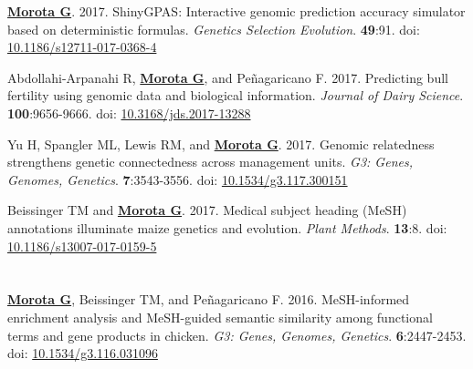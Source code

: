 \documentclass[margin,line,10pt]{res}
\newenvironment{list1}{
  \begin{list}{\ding{113}}{%
      \setlength{\itemsep}{0in}
      \setlength{\parsep}{0in} \setlength{\parskip}{0in}
      \setlength{\topsep}{0in} \setlength{\partopsep}{0in} 
      \setlength{\leftmargin}{0.17in}}}{\end{list}}
\begin{document}
\begin{resume}
\begin{list1}
\item  [{\bf 18}.] \textbf{\underline{Morota G}}. 2017. ShinyGPAS: Interactive genomic prediction accuracy simulator based on deterministic formulas. \emph{Genetics Selection Evolution}. \textbf{49}:91. doi: \textcolor{blue}{\href{https://dx.doi.org/10.1186/s12711-017-0368-4}{10.1186/s12711-017-0368-4}}

  \vspace{0.5cm}
    
\item  [{\bf 17}.] Abdollahi-Arpanahi R, \textbf{\underline{Morota G}}, and  Pe\~{n}agaricano F. 2017. Predicting bull fertility using genomic data and biological information. \emph{Journal of Dairy Science}. \textbf{100}:9656-9666. doi: \textcolor{blue}{\href{https://doi.org/10.3168/jds.2017-13288}{10.3168/jds.2017-13288}}

    \vspace{0.5cm}
    
  \item  [{\bf 16}.]  Yu H, Spangler ML, Lewis RM, and \textbf{\underline{Morota G}}. 2017. Genomic relatedness strengthens genetic connectedness across management units. \emph{G3: Genes, Genomes, Genetics}. \textbf{7}:3543-3556. doi: \textcolor{blue}{\href{https://doi.org/10.1534/g3.117.300151}{10.1534/g3.117.300151}}

    \vspace{0.5cm}
    
\item [{\bf 15}.] Beissinger TM and \textbf{\underline{Morota G}}. 2017. Medical subject heading (MeSH) annotations illuminate maize genetics and evolution. \emph{Plant Methods}. \textbf{13}:8. doi: \textcolor{blue}{\href{http://dx.doi.org/10.1186/s13007-017-0159-5}{10.1186/s13007-017-0159-5}}

\end{list1}



\section{}

\begin{list1}

  \item [{\bf 14}.]  \textbf{\underline{Morota G}}, Beissinger TM, and Pe\~{n}agaricano F. 2016. MeSH-informed enrichment analysis and MeSH-guided semantic similarity among functional terms and gene products in chicken. \emph{G3: Genes, Genomes, Genetics}. \textbf{6}:2447-2453. doi: \textcolor{blue}{\href{http://dx.doi.org/10.1534/g3.116.031096}{10.1534/g3.116.031096}}  


\end{list1}
\end{resume}
\end{document}
